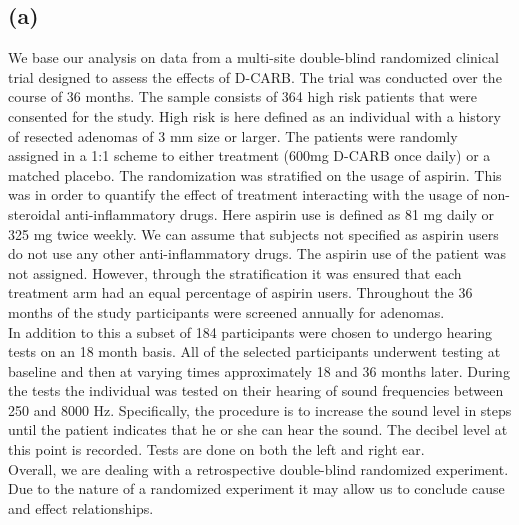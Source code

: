 \documentclass[paper=a4, fontsize=11pt]{scrartcl} %
\numberwithin{equation}{section} %
\numberwithin{figure}{section} %
\numberwithin{table}{section} %
\begin{document}
\subsection{(a)}
\label{sec:methods_a}
We base our analysis on data from a multi-site double-blind randomized clinical trial designed to assess the effects of D-CARB. The trial was conducted over the course of 36 months. The sample consists of 364 high risk patients that were consented for the study. High risk is here defined as an individual with a history of resected adenomas of 3 mm size or larger. The patients were randomly assigned in a 1:1 scheme to either treatment (600mg D-CARB once daily) or a matched placebo. The randomization was stratified on the usage of aspirin. This was in order to quantify the effect of treatment interacting with the usage of non-steroidal anti-inflammatory drugs. Here aspirin use is defined as 81 mg daily or 325 mg twice weekly. We can assume that subjects not specified as aspirin users do not use any other anti-inflammatory drugs. The aspirin use of the patient was not assigned. However, through the stratification it was ensured that each treatment arm had an equal percentage of aspirin users. Throughout the 36 months of the study participants were screened annually for adenomas.\\
In addition to this a subset of 184 participants were chosen to undergo hearing tests on an 18 month basis. All of the selected participants underwent testing at baseline and then at varying times approximately 18 and 36 months later. During the tests the individual was tested on their hearing of sound frequencies between 250 and 8000 Hz. Specifically, the procedure is to increase the sound level in steps until the patient indicates that he or she can hear the sound. The decibel level at this point is recorded. Tests are done on both the left and right ear.\\

Overall, we are dealing with a retrospective double-blind randomized experiment. Due to the nature of a randomized experiment it may allow us to conclude cause and effect relationships.
\end{document}

